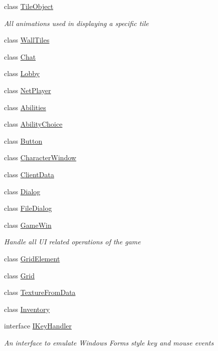 \begin{DoxyCompactItemize}
class \hyperlink{class_gruppe22_1_1_client_1_1_tile_object}{Tile\-Object}
\begin{DoxyCompactList}\small\item\em All animations used in displaying a specific tile \end{DoxyCompactList}\item 
class \hyperlink{class_gruppe22_1_1_client_1_1_wall_tiles}{Wall\-Tiles}
\item 
class \hyperlink{class_gruppe22_1_1_client_1_1_chat}{Chat}
\item 
class \hyperlink{class_gruppe22_1_1_client_1_1_lobby}{Lobby}
\item 
class \hyperlink{class_gruppe22_1_1_client_1_1_net_player}{Net\-Player}
\item 
class \hyperlink{class_gruppe22_1_1_client_1_1_abilities}{Abilities}
\item 
class \hyperlink{class_gruppe22_1_1_client_1_1_ability_choice}{Ability\-Choice}
\item 
class \hyperlink{class_gruppe22_1_1_client_1_1_button}{Button}
\item 
class \hyperlink{class_gruppe22_1_1_client_1_1_character_window}{Character\-Window}
\item 
class \hyperlink{class_gruppe22_1_1_client_1_1_client_data}{Client\-Data}
\item 
class \hyperlink{class_gruppe22_1_1_client_1_1_dialog}{Dialog}
\item 
class \hyperlink{class_gruppe22_1_1_client_1_1_file_dialog}{File\-Dialog}
\item 
class \hyperlink{class_gruppe22_1_1_client_1_1_game_win}{Game\-Win}
\begin{DoxyCompactList}\small\item\em Handle all U\-I related operations of the game \end{DoxyCompactList}\item 
class \hyperlink{class_gruppe22_1_1_client_1_1_grid_element}{Grid\-Element}
\item 
class \hyperlink{class_gruppe22_1_1_client_1_1_grid}{Grid}
\item 
class \hyperlink{class_gruppe22_1_1_client_1_1_texture_from_data}{Texture\-From\-Data}
\item 
class \hyperlink{class_gruppe22_1_1_client_1_1_inventory}{Inventory}
\item 
interface \hyperlink{interface_gruppe22_1_1_client_1_1_i_key_handler}{I\-Key\-Handler}
\begin{DoxyCompactList}\small\item\em An interface to emulate Windows Forms style key and mouse events \end{DoxyCompactList}\item 

\end{DoxyCompactItemize}
